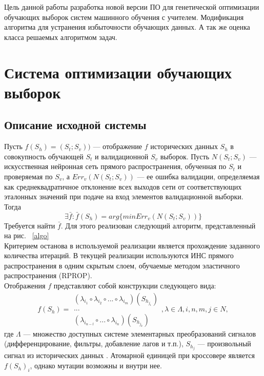 \documentclass[utf8,usehyperref,14pt]{G7-32}
\begin{document}
Цель данной работы разработка новой версии ПО для генетической оптимизации обучающих выборок систем машинного обучения с учителем. Модификация алгоритма для устранения избыточности обучающих данных. А так же оценка класса решаемых алгоритмом задач.

\mainmatter %
\chapter{Система оптимизации обучающих выборок}
\section{Описание исходной системы}
Пусть $ f(S_{h})=(S_{t}; S_{v})) $ --- отображение $f$ исторических данных $S_{h}$ в совокупность обучающей $S_{t}$ и валидационной $S_{v}$ выборок. Пусть $ N(S_{t}; S_{v}) $ --- искусственная нейронная сеть прямого распространения, обученная по $S_{t}$ и проверяемая по $S_{v}$, а $ Err_{v}(N(S_{t}; S_{v})) $ --- ее ошибка валидации, определяемая как среднеквадратичное отклонение всех выходов сети от соответствующих эталонных значений при подаче на вход элементов валидационной выборки. Тогда
\begin{equation}
\exists\bar{f}:\bar{f}(S_{h})=arg\{min Err_{v}(N(S_{t}; S_{v})) \}
\end{equation}
Требуется найти $ \bar{f} $. Для этого реализован следующий алгоритм, представленный на рис. ~\ref{algo} \\
Критерием останова в используемой реализации является прохождение заданного количества итераций. В текущей реализации используются ИНС прямого распространения в одним скрытым слоем, обучаемые методом эластичного распространения (RPROP).\\
Отображения $f$ представляют собой конструкции следующего вида:
\begin{equation}
f(S_{h})=\begin{array}{|c|}
(\lambda_{i_{1}} \circ \lambda_{i_{2}} \circ ... \circ \lambda_{i_{m}})(S_{h_{j_{1}}}) \\
...\\
(\lambda_{i_{n-l}} \circ ... \circ \lambda_{i_{n}})(S_{h_{j_{k}}})
\end{array}
, \lambda\in\Lambda, i,n,m,j\in N,
\end{equation}
где $\Lambda$ --- множество доступных системе элементарных преобразований сигналов (дифференцирование, фильтры, добавление лагов и т.п.), $S_{h_{j}}$ --- произвольный сигнал из исторических данных	. Атомарной единицей при кроссовере является $f(S_{h})_{i}$, однако мутации возможны и внутри нее.\\
\end{document}
